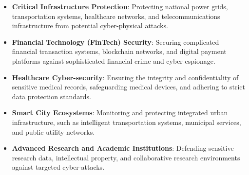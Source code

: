 \begin{itemize}
    \item \textbf{Critical Infrastructure Protection}: Protecting national power grids, transportation systems, healthcare networks, and telecommunications infrastructure from potential cyber-physical attacks.
    \item \textbf{Financial Technology (FinTech) Security}: Securing complicated financial transaction systems, blockchain networks, and digital payment platforms against sophisticated financial crime and cyber espionage.
    \item \textbf{Healthcare Cyber-security}: Ensuring the integrity and confidentiality of sensitive medical records, safeguarding medical devices, and adhering to strict data protection standards.
    \item \textbf{Smart City Ecosystems}: Monitoring and protecting integrated urban infrastructure, such as intelligent transportation systems, municipal services, and public utility networks.
    \item \textbf{Advanced Research and Academic Institutions}: Defending sensitive research data, intellectual property, and collaborative research environments against targeted cyber-attacks.
\end{itemize}

